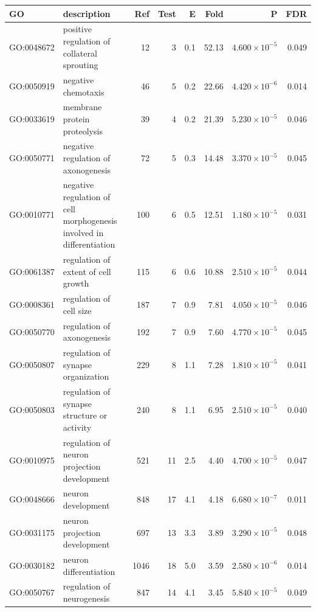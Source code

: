 \begin{table}[ht]
\centering
\begin{tabular}{llrrrrrr}
  \hline
GO & description & Ref & Test & E & Fold & P & FDR \\ 
  \hline
GO:0048672 & positive regulation of collateral sprouting  & 12 & 3 & 0.1 & 52.13 & $4.600 \times 10^{-5}$ & 0.049 \\ 
  GO:0050919 & negative chemotaxis  & 46 & 5 & 0.2 & 22.66 & $4.420 \times 10^{-6}$ & 0.014 \\ 
  GO:0033619 & membrane protein proteolysis  & 39 & 4 & 0.2 & 21.39 & $5.230 \times 10^{-5}$ & 0.046 \\ 
  GO:0050771 & negative regulation of axonogenesis  & 72 & 5 & 0.3 & 14.48 & $3.370 \times 10^{-5}$ & 0.045 \\ 
  GO:0010771 & \makecell{negative regulation of cell morphogenesis\\ involved in differentiation}  & 100 & 6 & 0.5 & 12.51 & $1.180 \times 10^{-5}$ & 0.031 \\ 
  GO:0061387 & regulation of extent of cell growth  & 115 & 6 & 0.6 & 10.88 & $2.510 \times 10^{-5}$ & 0.044 \\ 
  GO:0008361 & regulation of cell size  & 187 & 7 & 0.9 & 7.81 & $4.050 \times 10^{-5}$ & 0.046 \\ 
  GO:0050770 & regulation of axonogenesis  & 192 & 7 & 0.9 & 7.60 & $4.770 \times 10^{-5}$ & 0.045 \\ 
  GO:0050807 & regulation of synapse organization  & 229 & 8 & 1.1 & 7.28 & $1.810 \times 10^{-5}$ & 0.041 \\ 
  GO:0050803 & regulation of synapse structure or activity  & 240 & 8 & 1.1 & 6.95 & $2.510 \times 10^{-5}$ & 0.040 \\ 
  GO:0010975 & regulation of neuron projection development  & 521 & 11 & 2.5 & 4.40 & $4.700 \times 10^{-5}$ & 0.047 \\ 
  GO:0048666 & neuron development  & 848 & 17 & 4.1 & 4.18 & $6.680 \times 10^{-7}$ & 0.011 \\ 
  GO:0031175 & neuron projection development  & 697 & 13 & 3.3 & 3.89 & $3.290 \times 10^{-5}$ & 0.048 \\ 
  GO:0030182 & neuron differentiation  & 1046 & 18 & 5.0 & 3.59 & $2.580 \times 10^{-6}$ & 0.014 \\ 
  GO:0050767 & regulation of neurogenesis  & 847 & 14 & 4.1 & 3.45 & $5.840 \times 10^{-5}$ & 0.049 \\ 

\end{tabular}
\end{table}
